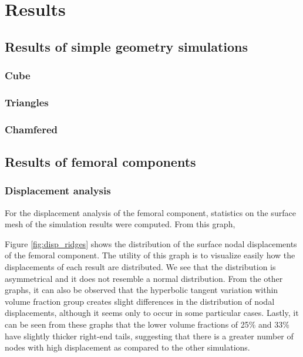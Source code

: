\documentclass[../main.tex]{subfiles}
\begin{document}
\chapter{Results}

\section{Results of simple geometry simulations}

\subsection{Cube}

\subsection{Triangles}

\subsection{Chamfered}

\section{Results of femoral components}



\subsection{Displacement analysis}

For the displacement analysis of the femoral component, statistics on the surface mesh of the simulation results were computed. From this graph,  

Figure \ref{fig:disp_ridges} shows the distribution of the surface nodal displacements of the femoral component. The utility of this graph is to visualize easily how the displacements of each result are distributed. We see that the distribution is asymmetrical and it does not resemble a normal distribution. From the other graphs, it can also be observed that the hyperbolic tangent variation within volume fraction group creates slight differences in the distribution of nodal displacements, although it seems only to occur in some particular cases. Lastly, it can be seen from these graphs that the lower volume fractions of 25\% and 33\% have slightly thicker right-end tails, suggesting that there is a greater number of nodes with high displacement as compared to the other simulations.
\end{document}
